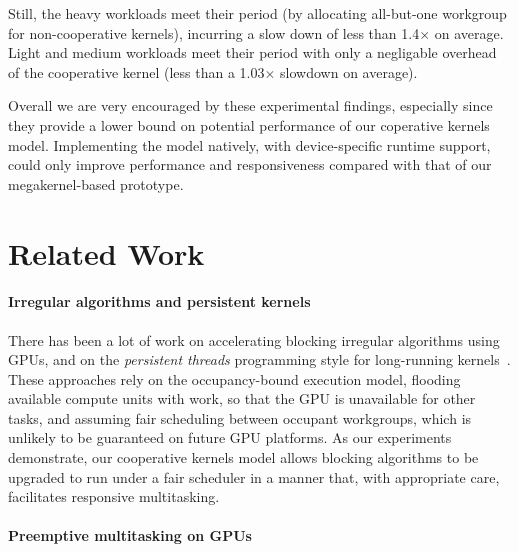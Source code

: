 \documentclass[numbers,nocopyrightspace,10pt]{sigplanconf}
\begin{document}
Still, the heavy
workloads meet their period (by allocating all-but-one workgroup for
non-cooperative kernels), incurring a slow down of less than 1.4$\times$ on average. Light
and medium workloads meet their period with only a negligable overhead
of the cooperative kernel (less than a 1.03$\times$ slowdown on average).

Overall we are very encouraged by these experimental findings, especially since they provide a lower bound on potential performance of our coperative kernels model. Implementing the model natively, with device-specific runtime support, could only improve performance and responsiveness compared with that of our megakernel-based prototype.

\section{Related Work}\label{sec:relatedwork}

\paragraph{Irregular algorithms and persistent kernels}

There has been a lot of work on accelerating blocking irregular
algorithms using GPUs, and on the \emph{persistent threads}
programming style for long-running
kernels~\cite{owens-persistent,DBLP:conf/ipps/KaleemVPHP16,DBLP:conf/ipps/DavidsonBGO14,DBLP:conf/hipc/HarishN07,DBLP:journals/topc/MerrillGG15,DBLP:conf/egh/VineetHPN09,DBLP:conf/ppopp/NobariCKB12,DBLP:conf/hpcc/SolomonTT10a,DBLP:conf/popl/PrabhuRMH11,DBLP:conf/ppopp/Mendez-LojoBP12,DBLP:conf/oopsla/PaiP16,DBLP:conf/oopsla/SorensenDBGR16,DBLP:conf/egh/CedermanT08,TPO10,BNP12,Pannotia}.
These approaches rely on the occupancy-bound execution model, flooding
available compute units with work, so that the GPU is unavailable for
other tasks, and assuming fair scheduling between occupant workgroups,
which is unlikely to be guaranteed on future GPU platforms.
%
As our experiments demonstrate, our cooperative kernels model allows blocking algorithms
to be upgraded to run under a fair scheduler in a manner that, with
appropriate care, facilitates responsive multitasking.

\paragraph{Preemptive multitasking on GPUs}
\end{document}
